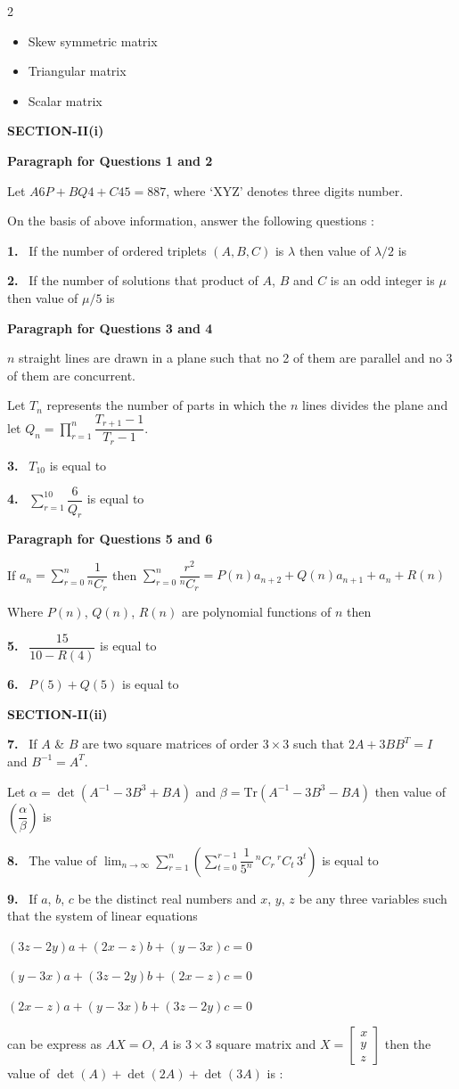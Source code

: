 \documentclass[10pt]{extarticle}
\newcommand{\sect}[1]{\par\smallskip\noindent\textbf{#1}\par}
\newcommand{\qn}[1]{\par\smallskip\noindent\textbf{#1.}~}
\newcommand{\paraq}[2]{\par\smallskip\noindent\textbf{Paragraph for Questions #1 and #2}\par}
\newenvironment{qoptions}{\begin{itemize}[leftmargin=1.8em,itemsep=1pt,topsep=2pt,label={}]}{\end{itemize}}
\newcommand{\opt}[2]{\item[(#1)] #2}
\begin{document}
\begin{multicols}{2}
\begin{qoptions}
\opt{B}{Skew symmetric matrix}
\opt{C}{Triangular matrix}
\opt{D}{Scalar matrix}
\end{qoptions}
\sect{SECTION-II(i)}
\paraq{1}{2}
Let $A6P+BQ4+C45=887$, where `XYZ' denotes three digits number.\par
On the basis of above information, answer the following questions :
\qn{1} If the number of ordered triplets $(A,B,C)$ is $\lambda$ then value of $\lambda/2$ is
\qn{2} If the number of solutions that product of $A$, $B$ and $C$ is an odd integer is $\mu$ then value of $\mu/5$ is
\paraq{3}{4}
$n$ straight lines are drawn in a plane such that no 2 of them are parallel and no 3 of them are concurrent.\par
Let $T_n$ represents the number of parts in which the $n$ lines divides the plane and let $Q_n=\displaystyle\prod_{r=1}^{n}\dfrac{T_{r+1}-1}{T_r-1}$.
\qn{3} $T_{10}$ is equal to
\qn{4} $\displaystyle\sum_{r=1}^{10}\dfrac{6}{Q_r}$ is equal to
\paraq{5}{6}
If $a_n=\displaystyle\sum_{r=0}^{n}\dfrac1{{}^nC_r}$ then $\displaystyle\sum_{r=0}^{n}\dfrac{r^2}{{}^nC_r}=P(n)a_{n+2}+Q(n)a_{n+1}+a_n+R(n)$\par
Where $P(n)$, $Q(n)$, $R(n)$ are polynomial functions of $n$ then
\qn{5} $\dfrac{15}{10-R(4)}$ is equal to
\qn{6} $P(5)+Q(5)$ is equal to
\sect{SECTION-II(ii)}
\qn{7} If $A$ \& $B$ are two square matrices of order $3\times3$ such that $2A+3BB^T=I$ and $B^{-1}=A^T$.\par
Let $\alpha=\det(A^{-1}-3B^3+BA)$ and $\beta=\text{Tr}(A^{-1}-3B^3-BA)$ then value of $\left(\dfrac\alpha\beta\right)$ is
\qn{8} The value of $\displaystyle\lim_{n\to\infty}\sum_{r=1}^{n}\left(\sum_{t=0}^{r-1}\dfrac1{5^n}\,{}^nC_r\,{}^rC_t\,3^t\right)$ is equal to
\qn{9} If $a$, $b$, $c$ be the distinct real numbers and $x$, $y$, $z$ be any three variables such that the system of linear equations\par
$(3z-2y)a+(2x-z)b+(y-3x)c=0$\par
$(y-3x)a+(3z-2y)b+(2x-z)c=0$\par
$(2x-z)a+(y-3x)b+(3z-2y)c=0$\par
can be express as $AX=O$, $A$ is $3\times3$ square matrix and $X=\begin{bmatrix}x\\y\\z\end{bmatrix}$ then the value of $\det(A)+\det(2A)+\det(3A)$ is :

\end{multicols}
\end{document}
